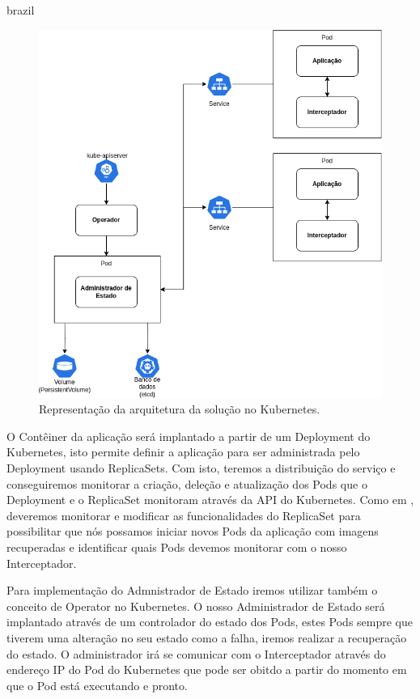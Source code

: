 \begin{otherlanguage*}{brazil}
\begin{figure}[h]
\centering
\includegraphics[scale=0.46]{images/kubernetes-architecture.png}
\caption{Representação da arquitetura da solução no Kubernetes.}
\label{fig:kubernetes-architecture}
\end{figure}

O Contêiner da aplicação será implantado a partir de um Deployment do Kubernetes, isto
permite definir a aplicação para ser administrada pelo Deployment usando ReplicaSets.
Com isto, teremos a distribuição do serviço e conseguiremos monitorar a criação, deleção
e atualização dos Pods que o Deployment e o ReplicaSet monitoram através da API do
Kubernetes. Como em \cite{schmidt2023state}, deveremos monitorar e modificar as
funcionalidades do ReplicaSet para possibilitar que nós possamos iniciar novos Pods
da aplicação com imagens recuperadas e identificar quais Pods devemos monitorar com
o nosso Interceptador.

Para implementação do Admnistrador de Estado iremos utilizar também o conceito de Operator
no Kubernetes. O nosso Administrador de Estado será implantado através de um controlador do
estado dos Pods, estes Pods sempre que tiverem uma alteração no seu estado como a falha, iremos
realizar a recuperação do estado. O administrador irá se comunicar com o Interceptador através
do endereço IP do Pod do Kubernetes que pode ser obitdo a partir do momento em que o Pod está
executando e pronto.


\end{otherlanguage*}
